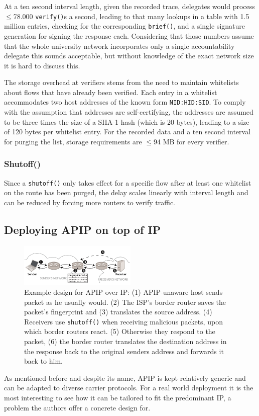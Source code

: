 \documentclass{acm_proc_article-sp}
\begin{document}
At a ten second interval length, given the recorded trace, delegates would process $\le$78.000 \texttt{verify()}s a second, leading to that many lookups in a table with 1.5 million entries, checking for the corresponding \texttt{brief()}, and a single signature generation for signing the response each. Considering that those numbers assume that the whole university network incorporates only a single accountability delegate this sounds acceptable, but without knowledge of the exact network size it is hard to discuss this.

The storage overhead at verifiers stems from the need to maintain whitelists about flows that have already been verified. Each entry in a whitelist accommodates two host addresses of the known form \texttt{NID:HID:SID}. To comply with the assumption that addresses are self-certifying, the addresses are assumed to be three times the size of a SHA-1 hash (which is 20 bytes), leading to a size of 120 bytes per whitelist entry. For the recorded data and a ten second interval for purging the list, storage requirements are $\le$94 MB for every verifier.

\subsubsection{Shutoff()}
Since a \texttt{shutoff()} only takes effect for a specific flow after at least one whitelist on the route has been purged, the delay scales linearly with interval length and can be reduced by forcing more routers to verify traffic.

\subsection{Deploying APIP on top of IP}
\begin{figure}
  \includegraphics[width=0.5\textwidth]{images/apipoverip.PNG}
  \caption{Example design for APIP over IP: (1) APIP-unaware host sends packet as he usually would. (2) The ISP's border router saves the packet's fingerprint and (3) translates the source address. (4) Receivers use \texttt{shutoff()} when receiving malicious packets, upon which border routers react. (5) Otherwise they respond to the packet, (6) the border router translates the destination address in the response back to the original senders address and forwards it back to him. \cite{apip}}
  \label{fig:apipoverip}
\end{figure}
As mentioned before and despite its name, APIP is kept relatively generic and can be adapted to diverse carrier protocols. For a real world deployment it is the most interesting to see how it can be tailored to fit the predominant IP, a problem the authors offer a concrete design for.
\end{document}
